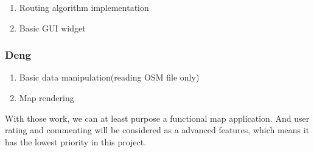 \documentclass[a4paper, 12pt, english]{book}
\begin{document}
\begin{enumerate}
	\item Routing algorithm implementation
	\item Basic GUI widget
\end{enumerate}

\subsubsection{Deng}
\begin{enumerate}
	\item Basic data manipulation(reading OSM file only)
	\item Map rendering
\end{enumerate}

With those work, we can at least purpose a functional map application. And user rating and commenting will be considered as a advanced features, which means it has the lowest priority in this project.

\end{document}
